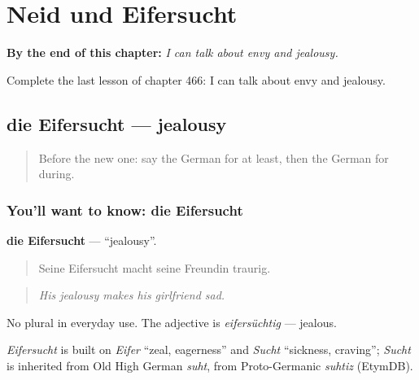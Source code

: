 
\chapter{Neid und Eifersucht}
\label{ch:ge-neid-und-eifersucht}

\begin{chapteropening}
\textbf{By the end of this chapter:} \emph{I can talk about envy and jealousy.}

Complete the last lesson of chapter 466: I can talk about envy and jealousy.
\end{chapteropening}

\section[die Eifersucht]{die Eifersucht — jealousy}

\label{lesson:GE-C466-eifersucht}



\begin{quote}
Before the new one: say the German for at least, then the German for during.
\end{quote}

\subsection*{You'll want to know: die Eifersucht}
\textbf{die Eifersucht} — \textquotedblleft{}jealousy\textquotedblright{}.

\begin{quote}
Seine Eifersucht macht seine Freundin traurig.
\end{quote}

\begin{quote}
\emph{His jealousy makes his girlfriend sad.}
\end{quote}

No plural in everyday use. The adjective is \emph{eifersüchtig} — jealous.

\begin{cousinweb}
\emph{Eifersucht} is built on \emph{Eifer} \textquotedblleft{}zeal, eagerness\textquotedblright{} and \emph{Sucht} \textquotedblleft{}sickness, craving\textquotedblright{}; \emph{Sucht} is inherited from Old High German \emph{suht}, from Proto-Germanic \emph{suhtiz} (EtymDB).
\end{cousinweb}

